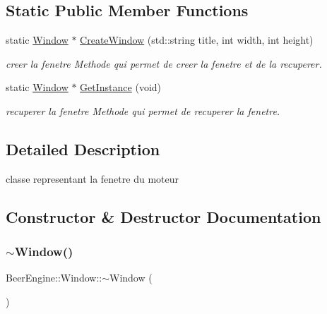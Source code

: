 \subsection*{Static Public Member Functions}
\begin{DoxyCompactItemize}
\item 
static \mbox{\hyperlink{class_beer_engine_1_1_window}{Window}} $\ast$ \mbox{\hyperlink{class_beer_engine_1_1_window_a630b8f5eca39a184818b876b1eb0374d}{Create\+Window}} (std\+::string title, int width, int height)
\begin{DoxyCompactList}\small\item\em creer la fenetre Methode qui permet de creer la fenetre et de la recuperer. \end{DoxyCompactList}\item 
static \mbox{\hyperlink{class_beer_engine_1_1_window}{Window}} $\ast$ \mbox{\hyperlink{class_beer_engine_1_1_window_a9a73331ffd93866e83e766540e3891fb}{Get\+Instance}} (void)
\begin{DoxyCompactList}\small\item\em recuperer la fenetre Methode qui permet de recuperer la fenetre. \end{DoxyCompactList}\end{DoxyCompactItemize}


\subsection{Detailed Description}
classe representant la fenetre du moteur 

\subsection{Constructor \& Destructor Documentation}
\mbox{\label{class_beer_engine_1_1_window_a3ae0fe522cf721377047b1027d591d33}} 
\subsubsection{\texorpdfstring{$\sim$\+Window()}{~Window()}}
{\footnotesize\ttfamily Beer\+Engine\+::\+Window\+::$\sim$\+Window (\begin{DoxyParamCaption}{ }\end{DoxyParamCaption})}



